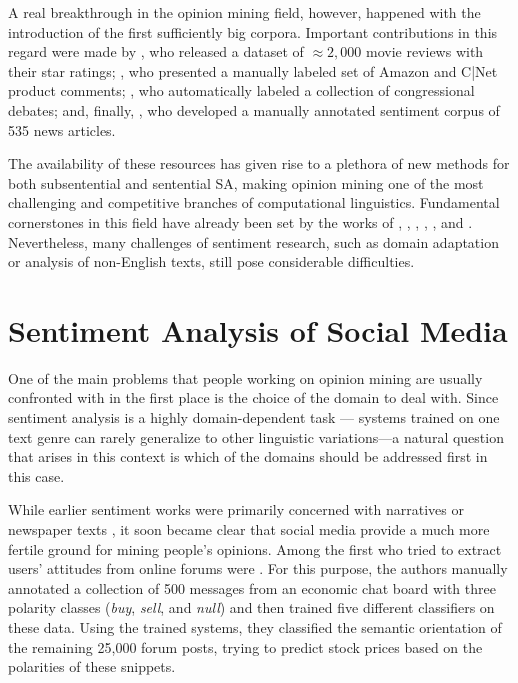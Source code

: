 A real breakthrough in the opinion mining field, however, happened
with the introduction of the first sufficiently big corpora.
Important contributions in this regard were made by
\citet{Pang:04,Pang:05}, who released a dataset of $\approx2,000$
movie reviews with their star ratings; \citet{Hu:04}, who presented a
manually labeled set of Amazon and C|Net product comments;
\citet{Thomas:06}, who automatically labeled a collection of
congressional debates; and, finally, \citet{Wiebe:05}, who developed a
manually annotated sentiment corpus of 535 news articles.

The availability of these resources has given rise to a plethora of
new methods for both subsentential and sentential SA, making opinion
mining one of the most challenging and competitive branches of
computational linguistics.  Fundamental cornerstones in this field
have already been set by the works of \citet{Pang:02},
\citet{Wiebe:05}, \citet{Wilson:05}, \citet{Breck:07},
\citet{Choi:09,Choi:10}, and \citet{Socher:11, Socher:12}.
Nevertheless, many challenges of sentiment research, such as domain
adaptation or analysis of non-English texts, still pose considerable
difficulties.

\section{Sentiment Analysis of Social Media}

One of the main problems that people working on opinion mining are
usually confronted with in the first place is the choice of the domain
to deal with. Since sentiment analysis is a highly domain-dependent
task \citep[see][]{Aue:05,Blitzer:07,Li:08}---\ie{} systems trained on
one text genre can rarely generalize to other linguistic
variations---a natural question that arises in this context is which
of the domains should be addressed first in this case.

While earlier sentiment works were primarily concerned with narratives
\citep{Wiebe:90a,Wiebe:94} or newspaper texts
\citep{Wiebe:03,Wiebe:05,Bautin:08}, it soon became clear that social
media provide a much more fertile ground for mining people's opinions.
Among the first who tried to extract users' attitudes from online
forums were \citet{Das:01}. For this purpose, the authors manually
annotated a collection of 500 messages from an economic chat board
with three polarity classes (\emph{buy}, \emph{sell}, and \emph{null})
and then trained five different classifiers on these data.  Using the
trained systems, they classified the semantic orientation of the
remaining 25,000 forum posts, trying to predict stock prices based on
the polarities of these snippets.

